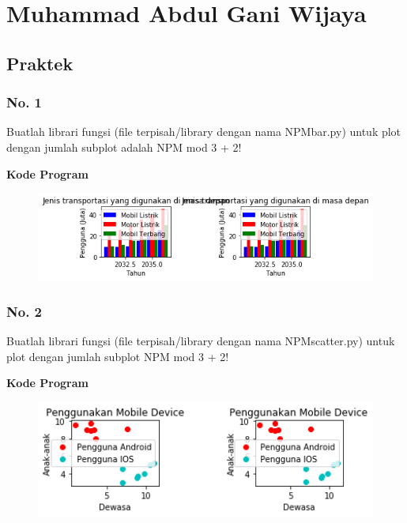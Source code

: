\section{Muhammad Abdul Gani Wijaya}
\subsection{Praktek}
\subsubsection{No. 1}
\hfill \break
Buatlah librari fungsi (file terpisah/library dengan nama NPMbar.py) untuk plot dengan jumlah subplot adalah NPM mod 3 + 2!

\hfill \break
\textbf{Kode Program}



\begin{figure}[H]
	\includegraphics[width=12cm]{figures/6/1174071/Praktek/barpraktek.png}
	\centering
\end{figure}

\subsubsection{No. 2}
\hfill \break
Buatlah librari fungsi (file terpisah/library dengan nama NPMscatter.py) untuk plot dengan jumlah subplot NPM mod 3 + 2!

\hfill \break
\textbf{Kode Program}



\begin{figure}[H]
	\includegraphics[width=12cm]{figures/6/1174071/Praktek/scatterpraktek.png}
	\centering
\end{figure}


